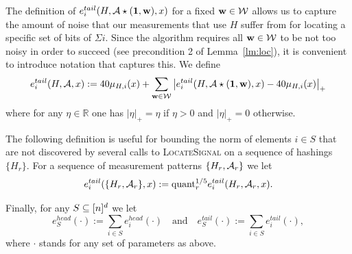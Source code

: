 The definition of $e^{tail}_i(H, {\mathcal{A}}\star (\mathbf{1}, \mathbf{w}), x)$ for a fixed $\mathbf{w}\in \mathcal{W}$ allows us to capture the amount of noise that our measurements that use $H$ suffer from for locating a specific set of bits of $\Sigma i$. Since the algorithm requires all $\mathbf{w}\in \mathcal{W}$ to be not too noisy in order to succeed (see precondition 2 of Lemma~\ref{lm:loc}), it is convenient to introduce notation that captures this. We define
\begin{equation}\label{eq:et-pi-a}
e^{tail}_i(H, {\mathcal{A}}, x):=40\mu_{H, i}(x)+\sum_{\mathbf{w}\in \mathcal{W}} \left|e^{tail}_i(H, {\mathcal{A}}\star (\mathbf{1}, \mathbf{w}), x)-40\mu_{H, i}(x)\right|_+
\end{equation}
where for any $\eta\in \mathbb{R}$ one has $|\eta|_+=\eta$ if $\eta>0$ and $|\eta|_+=0$ otherwise. 

The following definition is useful for bounding the norm of elements $i\in S$ that are not discovered by several calls to \textsc{LocateSignal} on a sequence of hashings $\{H_r\}$. For a sequence of measurement patterns $\{H_r, {\mathcal{A}}_r\}$ we let
\begin{equation}\label{eq:et}
e^{tail}_i(\{H_r, {\mathcal{A}}_r\}, x):=\text{quant}^{1/5}_r e^{tail}_i(H_r, {\mathcal{A}}_r, x).
\end{equation}

Finally, for any $S\subseteq {[n]^d}$ we let 
$$
e^{head}_S(\cdot):=\sum_{i\in S} e^{head}_i(\cdot)\text{~~~and~~~}e^{tail}_S(\cdot):=\sum_{i\in S} e^{tail}_i(\cdot),
$$
where $\cdot$ stands for any set of parameters as above.



